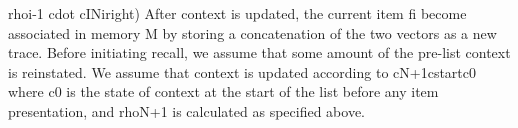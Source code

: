 {}\markdownRendererDollarSign{}\markdownRendererDollarSign{}\markdownRendererBackslash{}rho\markdownRendererLeftBrace{}i-1\markdownRendererRightBrace{} \markdownRendererBackslash{}cdot c\markdownRendererCircumflex{}\markdownRendererLeftBrace{}IN\markdownRendererRightBrace{}\markdownRendererUnderscore{}i\markdownRendererBackslash{}right)\markdownRendererDollarSign{}\markdownRendererDollarSign{}\markdownRendererInterblockSeparator
{}After context is updated, the current item \markdownRendererDollarSign{}fi\markdownRendererDollarSign{} become associated in memory \markdownRendererDollarSign{}M\markdownRendererDollarSign{} by storing a concatenation of the two vectors as a new trace.\markdownRendererInterblockSeparator
{}\markdownRendererInterblockSeparator
{}Before initiating recall, we assume that some amount of the pre-list context is reinstated. We assume that context is updated according to\markdownRendererInterblockSeparator
{}\markdownRendererDollarSign{}\markdownRendererDollarSign{}c\markdownRendererLeftBrace{}N+1\markdownRendererRightBrace{}c\markdownRendererLeftBrace{}start\markdownRendererRightBrace{}c\markdownRendererUnderscore{}0\markdownRendererDollarSign{}\markdownRendererDollarSign{}\markdownRendererInterblockSeparator
{}where \markdownRendererDollarSign{}c0\markdownRendererDollarSign{} is the state of context at the start of the list before any item presentation, and \markdownRendererDollarSign{}\markdownRendererBackslash{}rho\markdownRendererUnderscore{}\markdownRendererLeftBrace{}N+1\markdownRendererRightBrace{}\markdownRendererDollarSign{} is calculated as specified above.\markdownRendererInterblockSeparator
